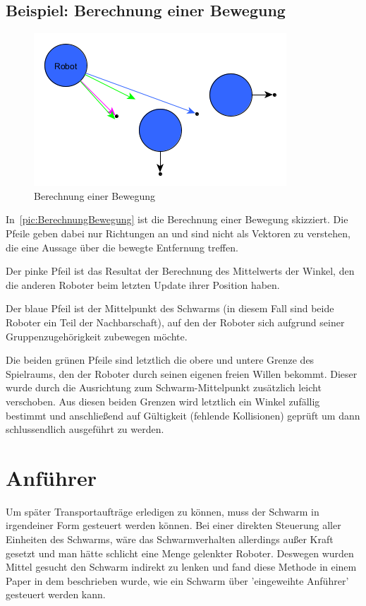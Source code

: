 \subsection*{Beispiel: Berechnung einer Bewegung}

\begin{figure}
	\includegraphics[width=\pictureWidth,keepaspectratio]{graphics/BerechnungBewegung.png}
	\caption{Berechnung einer Bewegung}
	\label{pic:BerechnungBewegung}
\end{figure}

In~\autoref{pic:BerechnungBewegung} ist die Berechnung einer Bewegung skizziert. Die Pfeile geben dabei nur Richtungen an und sind nicht als Vektoren zu verstehen, die eine Aussage über die bewegte Entfernung treffen.

Der pinke Pfeil ist das Resultat der Berechnung des Mittelwerts der Winkel, den die anderen Roboter beim letzten Update ihrer Position haben.

Der blaue Pfeil ist der Mittelpunkt des Schwarms (in diesem Fall sind beide Roboter ein Teil der Nachbarschaft), auf den der Roboter sich aufgrund seiner Gruppenzugehörigkeit zubewegen möchte.

Die beiden grünen Pfeile sind letztlich die obere und untere Grenze des Spielraums, den der Roboter durch seinen eigenen freien Willen bekommt. Dieser wurde durch die Ausrichtung zum Schwarm-Mittelpunkt zusätzlich leicht verschoben. Aus diesen beiden Grenzen wird letztlich ein Winkel zufällig bestimmt und anschließend auf Gültigkeit (fehlende Kollisionen) geprüft um dann schlussendlich ausgeführt zu werden.



\section{Anführer}

Um später Transportaufträge erledigen zu können, muss der Schwarm in irgendeiner Form gesteuert werden können. Bei einer direkten Steuerung aller Einheiten des Schwarms, wäre das Schwarmverhalten allerdings außer Kraft gesetzt und man hätte schlicht eine Menge gelenkter Roboter. Deswegen wurden Mittel gesucht den Schwarm indirekt zu lenken und fand diese Methode in einem Paper  in dem beschrieben wurde, wie ein Schwarm über 'eingeweihte Anführer' gesteuert werden kann.

